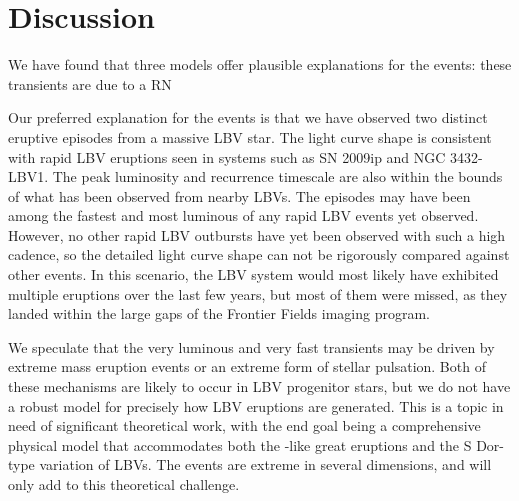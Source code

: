 \section{Discussion}\label{sec:Discussion}


We have found that three models offer plausible explanations for the
\spock events: these transients are due to a RN  

 Our preferred explanation for the \spock events is
that we have observed two distinct eruptive episodes from a massive
LBV star.  The light curve shape is consistent with rapid LBV
eruptions seen in systems such as SN 2009ip and NGC 3432-LBV1.  The
peak luminosity and recurrence timescale are also within the bounds of
what has been observed from nearby LBVs.  The \spock episodes may have
been among the fastest and most luminous of any rapid LBV events yet
observed. However, no other rapid LBV outbursts have yet been observed
with such a high cadence, so the detailed light curve shape can not be
rigorously compared against other events.  In this scenario, the
\spock LBV system would most likely have exhibited multiple eruptions
over the last few years, but most of them were missed, as they landed
within the large gaps of the \HST Frontier Fields imaging program.

We speculate that the very luminous and very fast \spock transients
may be driven by extreme mass eruption events or an extreme form of
stellar pulsation.  Both of these mechanisms are likely to occur in
LBV progenitor stars, but we do not have a robust model for precisely
how LBV eruptions are generated. This is a topic in need of
significant theoretical work, with the end goal being a comprehensive
physical model that accommodates both the \etacar-like great eruptions
and the S Dor-type variation of LBVs.  The \spock events are extreme
in several dimensions, and will only add to this theoretical
challenge.

